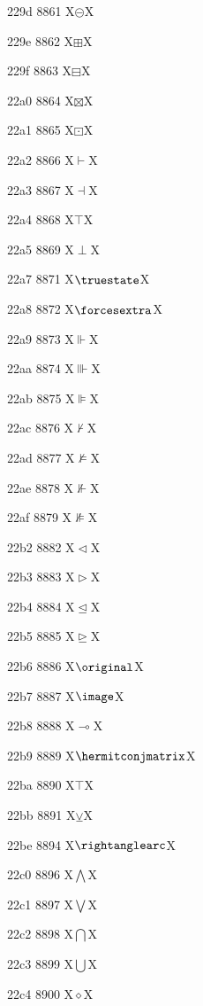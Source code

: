 \documentclass[11pt]{article}
\begin{document}
229d 8861 X{\ensuremath{\circleddash}}X

229e 8862 X{\ensuremath{\boxplus}}X

229f 8863 X{\ensuremath{\boxminus}}X

22a0 8864 X{\ensuremath{\boxtimes}}X

22a1 8865 X{\ensuremath{\boxdot}}X

22a2 8866 X{\ensuremath{\vdash}}X

22a3 8867 X{\ensuremath{\dashv}}X

22a4 8868 X{\ensuremath{\top}}X

22a5 8869 X{\ensuremath{\perp}}X

22a7 8871 X{\ensuremath{\truestate}}X

22a8 8872 X{\ensuremath{\forcesextra}}X

22a9 8873 X{\ensuremath{\Vdash}}X

22aa 8874 X{\ensuremath{\Vvdash}}X

22ab 8875 X{\ensuremath{\VDash}}X

22ac 8876 X{\ensuremath{\nvdash}}X

22ad 8877 X{\ensuremath{\nvDash}}X

22ae 8878 X{\ensuremath{\nVdash}}X

22af 8879 X{\ensuremath{\nVDash}}X

22b2 8882 X{\ensuremath{\vartriangleleft}}X

22b3 8883 X{\ensuremath{\vartriangleright}}X

22b4 8884 X{\ensuremath{\trianglelefteq}}X

22b5 8885 X{\ensuremath{\trianglerighteq}}X

22b6 8886 X{\ensuremath{\original}}X

22b7 8887 X{\ensuremath{\image}}X

22b8 8888 X{\ensuremath{\multimap}}X

22b9 8889 X{\ensuremath{\hermitconjmatrix}}X

22ba 8890 X{\ensuremath{\intercal}}X

22bb 8891 X{\ensuremath{\veebar}}X

22be 8894 X{\ensuremath{\rightanglearc}}X

22c0 8896 X{\ensuremath{\bigwedge}}X

22c1 8897 X{\ensuremath{\bigvee}}X

22c2 8898 X{\ensuremath{\bigcap}}X

22c3 8899 X{\ensuremath{\bigcup}}X

22c4 8900 X{\ensuremath{\diamond}}X
\end{document}
